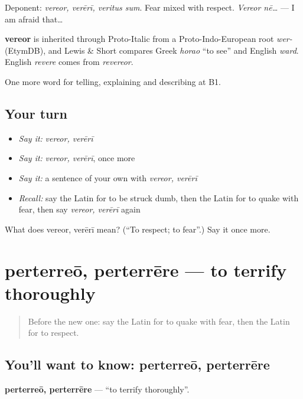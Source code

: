 Deponent: \emph{vereor, verērī, veritus sum}. Fear mixed with respect. \emph{Vereor nē…} — I am afraid that…

\begin{cousinweb}
\textbf{vereor} is inherited through Proto-Italic from a Proto-Indo-European root \emph{wer-} (EtymDB), and Lewis \& Short compares Greek \emph{horao} \textquotedblleft{}to see\textquotedblright{} and English \emph{ward}. English \emph{revere} comes from \emph{revereor}.
\end{cousinweb}

\begin{grammarlens}[title={What you've built}]
One more word for telling, explaining and describing at B1.
\end{grammarlens}

\subsection*{Your turn}
\begin{itemize}
\raggedright
  \item \emph{Say it:} \emph{vereor, verērī}
  \item \emph{Say it:} \emph{vereor, verērī}, once more
  \item \emph{Say it:} a sentence of your own with \emph{vereor, verērī}
  \item \emph{Recall:} say the Latin for to be struck dumb, then the Latin for to quake with fear, then say \emph{vereor, verērī} again
\end{itemize}

\begin{tcolorbox}[breakable,colback=teal!4,colframe=teal!35!black,title={Before you move on}]
What does vereor, verērī mean? (\textquotedblleft{}To respect; to fear\textquotedblright{}.) Say it once more.
\end{tcolorbox}
\section[perterreō, perterrēre]{perterreō, perterrēre — to terrify thoroughly}

\label{lesson:LA-C496-perterreo}



\begin{quote}
Before the new one: say the Latin for to quake with fear, then the Latin for to respect.
\end{quote}

\subsection*{You'll want to know: perterreō, perterrēre}
\textbf{perterreō, perterrēre} — \textquotedblleft{}to terrify thoroughly\textquotedblright{}.

